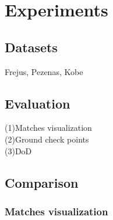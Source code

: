 \section{Experiments}
\subsection{Datasets}
Frejus, Pezenas, Kobe\\
\subsection{Evaluation}

(1)Matches visualization\\
(2)Ground check points\\
(3)DoD\\

\subsection{Comparison}

\subsubsection{Matches visualization}

